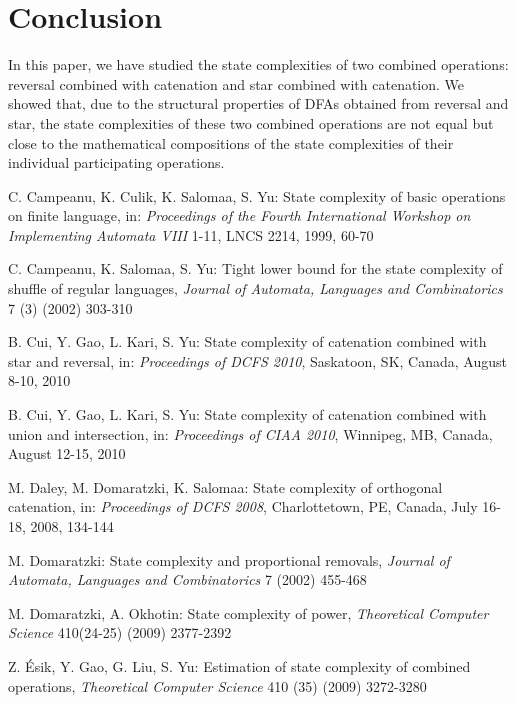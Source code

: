 \documentclass[10pt]{article}
\begin{document}
\section{Conclusion}\label{sec:conclusion}
In this paper, we have studied the state complexities of two combined operations: reversal combined with catenation and star combined with catenation.
We showed that, due to the structural properties of DFAs obtained from reversal and star, the state complexities of these two combined operations are not equal but close to the mathematical compositions of the state complexities of their individual participating operations.
\begin{thebibliography}{9}
    C. Campeanu, K. Culik, K. Salomaa, S. Yu:
    State complexity of basic operations on finite language,
    in: {\it Proceedings of the Fourth International Workshop on Implementing Automata VIII} 1-11,
    LNCS 2214, 1999, 60-70

    C. Campeanu, K. Salomaa, S. Yu:
    Tight lower bound for the state complexity of shuffle of regular languages,
    {\it Journal of Automata, Languages and Combinatorics} 7 (3) (2002) 303-310

    B. Cui, Y. Gao, L. Kari, S. Yu:
    State complexity of catenation combined with star and reversal,
    in: {\it Proceedings of DCFS 2010}, Saskatoon, SK, Canada,  August 8-10, 2010

    B. Cui, Y. Gao, L. Kari, S. Yu:
    State complexity of catenation combined with union and intersection,
    in: {\it Proceedings of CIAA 2010}, Winnipeg, MB, Canada,  August 12-15, 2010

    M. Daley, M. Domaratzki, K. Salomaa:
    State complexity of orthogonal catenation,
    in: {\it Proceedings of DCFS 2008}, Charlottetown, PE, Canada, July 16-18, 2008, 134-144

    M. Domaratzki:
    State complexity and proportional removals,
    {\it Journal of Automata, Languages and Combinatorics} 7 (2002) 455-468

    M. Domaratzki, A. Okhotin:
    State complexity of power,
    {\it Theoretical Computer Science} 410(24-25) (2009) 2377-2392

    Z. \'Esik, Y. Gao, G. Liu, S. Yu:
    Estimation of state complexity of combined operations,
    {\it Theoretical Computer Science} 410 (35) (2009) 3272-3280


\end{thebibliography}
\end{document}
